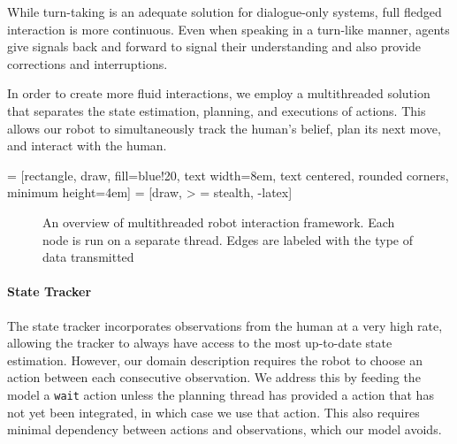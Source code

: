 \documentclass{article}
\begin{document}
\begin{multicols}{2}
While turn-taking is an adequate solution for dialogue-only systems, full fledged interaction is more continuous. Even when speaking in a turn-like manner, agents give signals back and forward to signal their understanding and also provide corrections and interruptions.

In order to create more fluid interactions, we employ a multithreaded solution that separates the state estimation, planning, and executions of actions. This allows our robot to simultaneously track the human's belief, plan its next move, and interact with the human. 


 = [rectangle, draw, fill=blue!20, text width=8em, text centered, rounded corners, minimum height=4em]
 = [draw, > = stealth, -latex]

\begin{figure}
\begin{center}
\caption{An overview of multithreaded robot interaction framework. Each node is run on a separate thread. Edges are labeled with the type of data transmitted}
\end{center}
\end{figure}




\paragraph{State Tracker} The state tracker incorporates observations from the human at a very high rate, allowing the tracker to always have access to the most up-to-date state estimation. However, our domain description requires the robot to choose an action between each consecutive observation. We address this by feeding the model a \texttt{wait} action unless the planning thread has provided a action that has not yet been integrated, in which case we use that action. This also requires minimal dependency between actions and observations, which our model avoids. 


\end{multicols}
\end{document}
